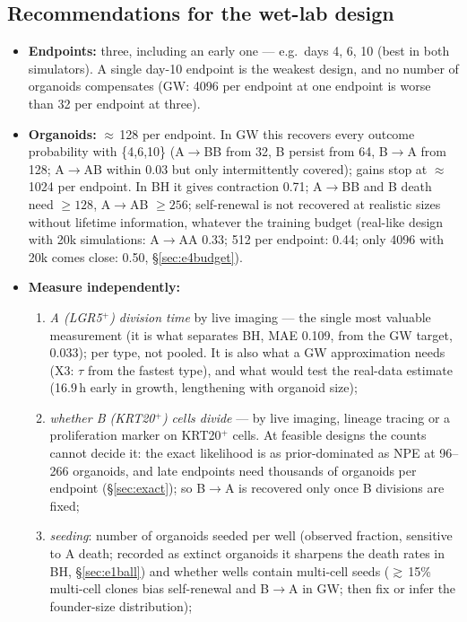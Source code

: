 \documentclass[10pt,a4paper]{article}
\begin{document}
\subsection*{Recommendations for the wet-lab design}
\begin{itemize}
\item \textbf{Endpoints:} three, including an early one --- e.g.\ days 4, 6, 10 (best in both simulators). A single day-10 endpoint is the weakest design, and no number of organoids compensates (GW: 4096 per endpoint at one endpoint is worse than 32 per endpoint at three).
\item \textbf{Organoids:} $\approx$\,128 per endpoint. In GW this recovers every outcome probability with \{4,6,10\} (A$\to$BB from 32, B persist from 64, B$\to$A from 128; A$\to$AB within 0.03 but only intermittently covered); gains stop at $\approx$\,1024 per endpoint. In BH it gives contraction 0.71; A$\to$BB and B death need $\ge 128$, A$\to$AB $\ge 256$; self-renewal is not recovered at realistic sizes without lifetime information, whatever the training budget (real-like design with 20k simulations: A$\to$AA 0.33; 512 per endpoint: 0.44; only 4096 with 20k comes close: 0.50, \S\ref{sec:e4budget}).
\item \textbf{Measure independently:}
  \begin{enumerate}[label=(\alph*)]
  \item \emph{A (LGR5$^+$) division time} by live imaging --- the single most valuable measurement (it is what separates BH, MAE 0.109, from the GW target, 0.033); per type, not pooled. It is also what a GW approximation needs (X3: $\tau$ from the fastest type), and what would test the real-data estimate (16.9\,h early in growth, lengthening with organoid size);
  \item \emph{whether B (KRT20$^+$) cells divide} --- by live imaging, lineage tracing or a proliferation marker on KRT20$^+$ cells. At feasible designs the counts cannot decide it: the exact likelihood is as prior-dominated as NPE at 96--266 organoids, and late endpoints need thousands of organoids per endpoint (\S\ref{sec:exact}); so B$\to$A is recovered only once B divisions are fixed;
  \item \emph{seeding}: number of organoids seeded per well (observed fraction, sensitive to A death; recorded as extinct organoids it sharpens the death rates in BH, \S\ref{sec:e1ball}) and whether wells contain multi-cell seeds ($\gtrsim$\,15\% multi-cell clones bias self-renewal and B$\to$A in GW; then fix or infer the founder-size distribution);

\end{enumerate}
\end{itemize}
\end{document}

